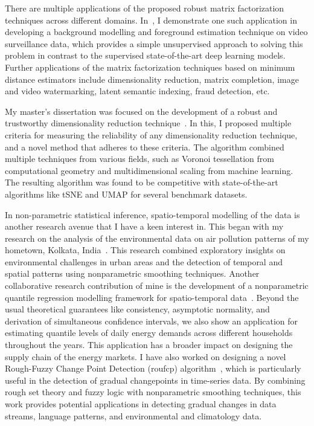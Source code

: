 \documentclass[a4paper,10pt]{article}
\begin{document}
There are multiple applications of the proposed robust matrix factorization techniques across different domains. In~\cite{roy2024rsvddpd}, I demonstrate one such application in developing a background modelling and foreground estimation technique on video surveillance data, which provides a simple unsupervised approach to solving this problem in contrast to the supervised state-of-the-art deep learning models. Further applications of the matrix factorization techniques based on minimum distance estimators include dimensionality reduction, matrix completion, image and video watermarking, latent semantic indexing, fraud detection, etc.

My master's dissertation was focused on the development of a robust and trustworthy dimensionality reduction technique~\cite{roy2024trustworthy}. In this, I proposed multiple criteria for measuring the reliability of any dimensionality reduction technique, and a novel method that adheres to these criteria. The algorithm combined multiple techniques from various fields, such as Voronoi tessellation from computational geometry and multidimensional scaling from machine learning. The resulting algorithm was found to be competitive with state-of-the-art algorithms like tSNE and UMAP for several benchmark datasets.

In non-parametric statistical inference, spatio-temporal modelling of the data is another research avenue that I have a keen interest in. This began with my research on the analysis of the environmental data on air pollution patterns of my hometown, Kolkata, India~\cite{roy2020pollution}. This research combined exploratory insights on environmental challenges in urban areas and the detection of temporal and spatial patterns using nonparametric smoothing techniques. Another collaborative research contribution of mine is the development of a nonparametric quantile regression modelling framework for spatio-temporal data~\cite{deb2024nonparametric}. Beyond the usual theoretical guarantees like consistency, asymptotic normality, and derivation of simultaneous confidence intervals, we also show an application for estimating quantile levels of daily energy demands across different households throughout the years. This application has a broader impact on designing the supply chain of the energy markets. I have also worked on designing a novel Rough-Fuzzy Change Point Detection (roufcp) algorithm~\cite{bhaduri2022rough}, which is particularly useful in the detection of gradual changepoints in time-series data. By combining rough set theory and fuzzy logic with nonparametric smoothing techniques, this work provides potential applications in detecting gradual changes in data streams, language patterns, and environmental and climatology data.
\end{document}
